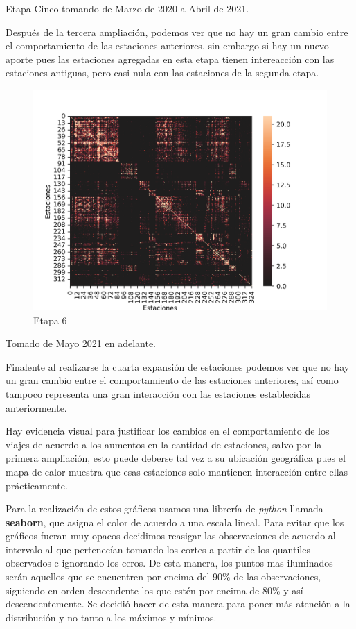 \documentclass[
]{article}
\begin{document}
Etapa Cinco tomando de Marzo de 2020 a Abril de 2021.

Después de la tercera ampliación, podemos ver que no hay un gran cambio
entre el comportamiento de las estaciones anteriores, sin embargo si hay
un nuevo aporte pues las estaciones agregadas en esta etapa tienen
intereacción con las estaciones antiguas, pero casi nula con las
estaciones de la segunda etapa.

\begin{figure}
\centering
\includegraphics{../plots/resultsSeis.png}
\caption{Etapa 6}
\end{figure}

Tomado de Mayo 2021 en adelante.

Finalente al realizarse la cuarta expansión de estaciones podemos ver
que no hay un gran cambio entre el comportamiento de las estaciones
anteriores, así como tampoco representa una gran interacción con las
estaciones establecidas anteriormente.

Hay evidencia visual para justificar los cambios en el comportamiento de
los viajes de acuerdo a los aumentos en la cantidad de estaciones, salvo
por la primera ampliación, esto puede deberse tal vez a su ubicación
geográfica pues el mapa de calor muestra que esas estaciones solo
mantienen interacción entre ellas prácticamente.

Para la realización de estos gráficos usamos una librería de
\emph{python} llamada \textbf{seaborn}, que asigna el color de acuerdo a
una escala lineal. Para evitar que los gráficos fueran muy opacos
decidimos reasigar las observaciones de acuerdo al intervalo al que
pertenecían tomando los cortes a partir de los quantiles observados e
ignorando los ceros. De esta manera, los puntos mas iluminados serán
aquellos que se encuentren por encima del 90\% de las observaciones,
siguiendo en orden descendente los que estén por encima de 80\% y así
descendentemente. Se decidió hacer de esta manera para poner más
atención a la distribución y no tanto a los máximos y mínimos.
\end{document}
